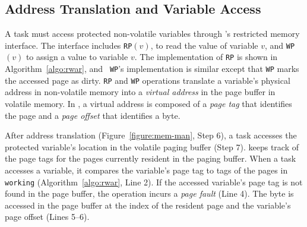 \subsection{Address Translation and Variable Access}
%
A task must access protected non-volatile variables through \sys's
restricted memory interface. The interface includes \texttt{RP}$(v)$, to read the value of variable
$v$, and \texttt{WP}$(v)$ to assign a value to variable $v$. The
implementation of {\tt RP} is shown in Algorithm~\ref{algo:rwar}, and {\tt
WP}'s implementation is similar except that {\tt WP} marks the accessed page as
dirty.
%
{\tt RP} and {\tt WP} operations translate a variable's physical address in
non-volatile memory into a \emph{virtual address} in the page buffer in
volatile memory. In \sys, a virtual address is composed of a \emph{page tag}
that identifies the page and a \emph{page offset} that identifies a byte.
%
\begin{figure}
\end{figure}
%
After address translation (Figure~\ref{figure:mem-man}, Step 6), a task
accesses the protected variable's location in the volatile paging buffer
(Step 7). \sys keeps track of the page tags for
the pages currently resident in the paging buffer. When a task accesses a
variable, it compares the variable's page tag to tags of the pages in {\tt
working} (Algorithm~\ref{algo:rwar}, Line 2).
%
If the accessed variable's page tag is not found in the page buffer, the
operation incurs a {\em page fault} (Line 4).
%
The byte is accessed in the page buffer at the index of the resident page and
the variable's page offset (Lines 5--6).
%

